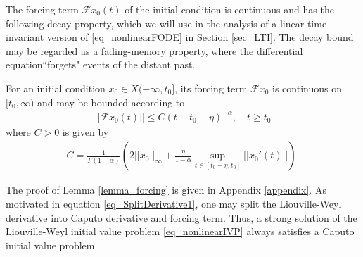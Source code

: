 \documentclass{svproc}
\begin{document}
	The forcing term $\mathcal F x_0(t)$ of the initial condition is continuous and has the following decay property, which we will use in the analysis of a linear time-invariant version of \eqref{eq_nonlinearFODE} in Section \ref{sec_LTI}. The decay bound may be regarded as a fading-memory property, where the differential equation``forgets" events of the distant past. 
	\begin{lemma}\label{lemma_forcing}
		For an initial condition $x_0\in X(-\infty,t_0]$, {its forcing term $\mathcal F x_0$ is continuous on $[t_0,\infty)$} and may be bounded according to
		\begin{align}\label{eq_forcingBoundInftyNormNew}
			||\mathcal F x_0(t)||\leq C(t-t_0+\eta)^{-\alpha},\quad t\geq t_0
		\end{align} where $C>0$ is given by
		\begin{align}
			C = \frac{1}{\Gamma(1-\alpha)}\left(2||x_0||_\infty + \frac{\eta}{1-\alpha}\sup_{t\in [t_0-\eta,t_0]}||x_0'(t)||\right).
		\end{align}
	\end{lemma}
{ 
The proof of Lemma \ref{lemma_forcing} is given in Appendix \ref{appendix}.}
As motivated in equation \eqref{eq_SplitDerivative1}, one may split the Liouville-Weyl derivative into Caputo derivative and forcing term. Thus, a { strong} solution of the Liouville-Weyl initial value problem \eqref{eq_nonlinearIVP} always satisfies a Caputo initial value problem
\end{document}
